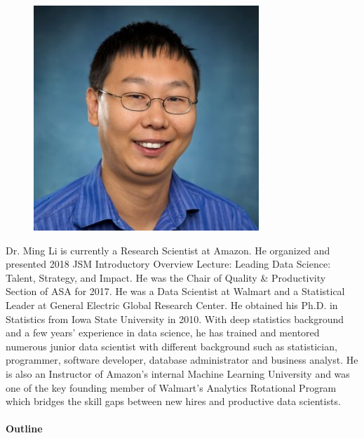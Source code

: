 \documentclass[11pt]{article}
\begin{document}
\begin{figure}
  \vspace{-25pt}
  \begin{center}
    \includegraphics[width=\linewidth]{Ming-Li.png}
  \end{center}  
  \vspace{-25pt}
\end{figure}
Dr. Ming Li is currently a Research Scientist at Amazon.
He organized and presented 2018 JSM
Introductory Overview Lecture: Leading Data Science: Talent, Strategy,
and Impact. He was the Chair of Quality \& Productivity Section of ASA
for 2017. He was a Data Scientist at Walmart and a Statistical Leader
at General Electric Global Research Center. He obtained his Ph.D. in
Statistics from Iowa State University in 2010. With deep statistics
background and a few years’ experience in data science, he has trained
and mentored numerous junior data scientist with different background
such as statistician, programmer, software developer, database
administrator and business analyst. He is also an Instructor of
Amazon’s internal Machine Learning University and was one of the key
founding member of Walmart’s Analytics Rotational Program which
bridges the skill gaps between new hires and productive data
scientists.


\paragraph{Outline}
\end{document}
